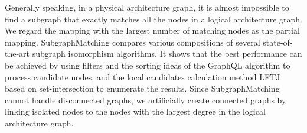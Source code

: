 \documentclass[journal]{IEEEtran}
\begin{document}
Generally speaking, in a physical architecture graph, it is almost impossible to find a subgraph that exactly matches all the nodes in a logical architecture graph. We regard the mapping with the largest number of matching nodes as the partial mapping. SubgraphMatching compares various compositions of several state-of-the-art subgraph isomorphism algorithms.  
It shows that the best performance can be achieved by using filters and the sorting ideas of the GraphQL algorithm to process candidate nodes, and the local candidates calculation method LFTJ based on set-intersection to enumerate the results. Since SubgraphMatching cannot handle disconnected graphs, we artificially create connected graphs by linking isolated nodes to the nodes with the largest degree in the logical architecture graph. %
\end{document}
